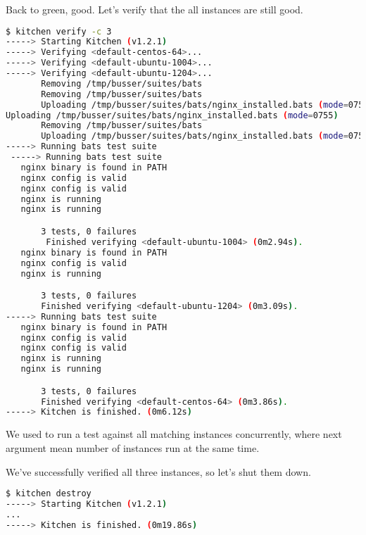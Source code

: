 Back to green, good. Let's verify that the all instances are still good.

\begin{lstlisting}[language=Bash,label=lst:testing-test-kitchen32]
$ kitchen verify -c 3
-----> Starting Kitchen (v1.2.1)
-----> Verifying <default-centos-64>...
-----> Verifying <default-ubuntu-1004>...
-----> Verifying <default-ubuntu-1204>...
       Removing /tmp/busser/suites/bats
       Removing /tmp/busser/suites/bats
       Uploading /tmp/busser/suites/bats/nginx_installed.bats (mode=0755)
Uploading /tmp/busser/suites/bats/nginx_installed.bats (mode=0755)
       Removing /tmp/busser/suites/bats
       Uploading /tmp/busser/suites/bats/nginx_installed.bats (mode=0755)
-----> Running bats test suite
 -----> Running bats test suite                                             1/3
   nginx binary is found in PATH
   nginx config is valid                                                    2/3
   nginx config is valid
   nginx is running                                                         3/3
   nginx is running

       3 tests, 0 failures
        Finished verifying <default-ubuntu-1004> (0m2.94s).                 1/3
   nginx binary is found in PATH
   nginx config is valid
   nginx is running

       3 tests, 0 failures
       Finished verifying <default-ubuntu-1204> (0m3.09s).
-----> Running bats test suite
   nginx binary is found in PATH
   nginx config is valid                                                    2/3
   nginx config is valid
   nginx is running                                                         3/3
   nginx is running

       3 tests, 0 failures
       Finished verifying <default-centos-64> (0m3.86s).
-----> Kitchen is finished. (0m6.12s)
\end{lstlisting}

We used  to run a test against all matching instances concurrently, where next argument mean number of instances run at the same time.

We've successfully verified all three instances, so let's shut them down.

\begin{lstlisting}[language=Bash,label=lst:testing-test-kitchen33]
$ kitchen destroy
-----> Starting Kitchen (v1.2.1)
...
-----> Kitchen is finished. (0m19.86s)
\end{lstlisting}

